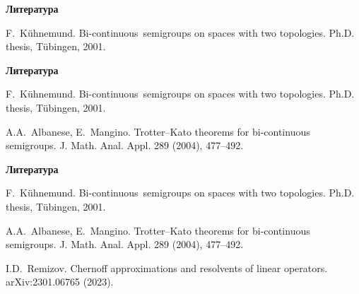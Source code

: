 \documentclass[11pt]{article}
\begin{document}
\newpage

\begin{center}
{\color{notaeYELLOW}\bfseries\fontsize{44}{52}\selectfont Литература}
\end{center}
\vspace*{\fill}
\begin{center}
\fontsize{36}{43}\selectfont
\parbox{\linewidth}{\centering\noindent [1] F.~Kühnemund. Bi-continuous\ semigroups on spaces with two topologies. Ph.D. thesis, Tübingen, 2001.
\par}\vspace{0.4in}
\end{center}
\vspace*{\fill}

\newpage

\begin{center}
{\color{notaeYELLOW}\bfseries\fontsize{44}{52}\selectfont Литература}
\end{center}
\vspace*{\fill}
\begin{center}
\fontsize{36}{43}\selectfont
\parbox{\linewidth}{\centering\noindent [1] F.~Kühnemund. Bi-continuous\ semigroups on spaces with two topologies. Ph.D. thesis, Tübingen, 2001.
\par}\vspace{0.4in}
\parbox{\linewidth}{\centering\noindent [2] A.A.~Albanese, E.~Mangino. Trotter--Kato theorems for bi-continuous semigroups. J. Math. Anal. Appl. 289 (2004), 477--492.
\par}\vspace{0.4in}
\end{center}
\vspace*{\fill}

\newpage

\begin{center}
{\color{notaeYELLOW}\bfseries\fontsize{44}{52}\selectfont Литература}
\end{center}
\vspace*{\fill}
\begin{center}
\fontsize{36}{43}\selectfont
\parbox{\linewidth}{\centering\noindent [1] F.~Kühnemund. Bi-continuous\ semigroups on spaces with two topologies. Ph.D. thesis, Tübingen, 2001.
\par}\vspace{0.4in}
\parbox{\linewidth}{\centering\noindent [2] A.A.~Albanese, E.~Mangino. Trotter--Kato theorems for bi-continuous semigroups. J. Math. Anal. Appl. 289 (2004), 477--492.
\par}\vspace{0.4in}
\parbox{\linewidth}{\centering\noindent [3] I.D.~Remizov. Chernoff approximations and resolvents of linear operators. arXiv:2301.06765 (2023).
\par}\vspace{0.4in}
\end{center}
\vspace*{\fill}
\end{document}
